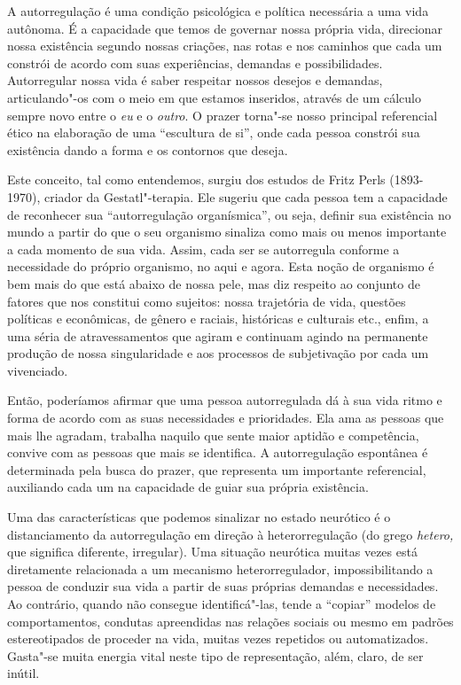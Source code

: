 A autorregulação é uma condição psicológica e política necessária a uma
vida autônoma. É a capacidade que temos de governar nossa própria vida,
direcionar nossa existência segundo nossas criações, nas rotas e nos
caminhos que cada um constrói de acordo com suas experiências, demandas
e possibilidades. Autorregular nossa vida é saber respeitar nossos
desejos e demandas, articulando"-os com o meio em que estamos inseridos,
através de um cálculo sempre novo entre o \emph{eu} e o \emph{outro}. O
prazer torna"-se nosso principal referencial ético na elaboração de uma
``escultura de si'', onde cada pessoa constrói sua existência dando a
forma e os contornos que deseja.

Este conceito, tal como entendemos, surgiu dos estudos de Fritz Perls
(1893-1970), criador da Gestatl"-terapia. Ele sugeriu que cada pessoa tem
a capacidade de reconhecer sua ``autorregulação organísmica'', ou seja,
definir sua existência no mundo a partir do que o seu organismo sinaliza
como mais ou menos importante a cada momento de sua vida. Assim, cada
ser se autorregula conforme a necessidade do próprio organismo, no aqui
e agora. Esta noção de organismo é bem mais do que está abaixo de nossa
pele, mas diz respeito ao conjunto de fatores que nos constitui como
sujeitos: nossa trajetória de vida, questões políticas e econômicas, de
gênero e raciais, históricas e culturais etc., enfim, a uma séria de
atravessamentos que agiram e continuam agindo na permanente produção de
nossa singularidade e aos processos de subjetivação por cada um
vivenciado.

Então, poderíamos afirmar que uma pessoa autorregulada dá à sua vida
ritmo e forma de acordo com as suas necessidades e prioridades. Ela ama
as pessoas que mais lhe agradam, trabalha naquilo que sente maior
aptidão e competência, convive com as pessoas que mais se identifica. A
autorregulação espontânea é determinada pela busca do prazer, que
representa um importante referencial, auxiliando cada um na capacidade
de guiar sua própria existência.

Uma das características que podemos sinalizar no estado neurótico é o
distanciamento da autorregulação em direção à heterorregulação (do grego
\emph{hetero,} que significa diferente, irregular). Uma situação
neurótica muitas vezes está diretamente relacionada a um mecanismo
heterorregulador, impossibilitando a pessoa de conduzir sua vida a
partir de suas próprias demandas e necessidades. Ao contrário, quando
não consegue identificá"-las, tende a ``copiar'' modelos de
comportamentos, condutas apreendidas nas relações sociais ou mesmo em
padrões estereotipados de proceder na vida, muitas vezes repetidos ou
automatizados. Gasta"-se muita energia vital neste tipo de representação,
além, claro, de ser inútil.

